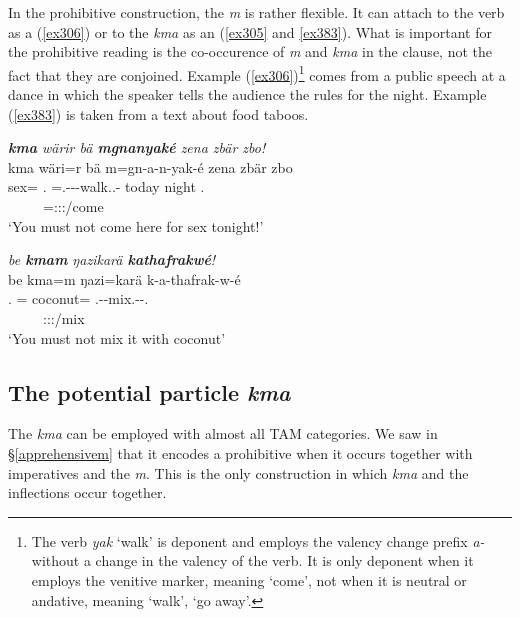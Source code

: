 In the prohibitive construction, the  \emph{m} is rather flexible. It can attach to the verb as a  (\ref{ex306}) or to the   \emph{kma} as an  (\ref{ex305} and \ref{ex383}). What is important for the prohibitive reading is the co-occurence of \emph{m} and \emph{kma} in the clause, not the fact that they are conjoined. Example (\ref{ex306})\footnote{The verb \emph{yak} ‘walk’ is deponent and employs the valency change prefix \emph{a-} without a change in the valency of the verb. It is only deponent when it employs the venitive marker, meaning ‘come’, not when it is neutral or andative, meaning ‘walk’, ‘go away’.} comes from a public speech at a dance in which the speaker tells the audience the rules for the night. Example (\ref{ex383}) is taken from a text about food taboos.

\begin{exe}
	\ex \emph{\textbf{kma} wärir bä \textbf{mgnanyaké} zena zbär zbo!}\\
	\glll kma wäri=r bä m=gn-a-n-yak-é zena zbär zbo\\
	{\Pot} sex={\Purp} \Second.{\Abs} \Appr=\Ssg.\Bet-\Vc-\Venit-walk.\Ext.\Ndu-{\Imp} today night \Prox.\All\\
	~ ~ ~ {\footnotesize \Appr=\Ssg:\Sbj:\Imp:\Ipfv/come} ~ ~ ~\\
	\trans `You must not come here for sex tonight!' 
	\label{ex306}
\end{exe}
\begin{exe}
	\ex \emph{be \textbf{kmam} ŋazikarä \textbf{kathafrakwé}!}\\
	\gll be kma=m ŋazi=karä k-a-thafrak-w-é\\
	\Ssg.{\Erg} \Pot={\Appr} coconut={\Prop} \M.\Bet-\Vc-mix.\Ext-\Ndu-\Ssg.{\Imp}\\
	~ ~ ~ {\footnotesize \Ssg:\Sbj:\Imp:\Ext/mix}\\
	\trans `You must not mix it with coconut' 
	\label{ex383}
\end{exe}

\subsection{The potential particle \emph{kma}}\label{potentialkma}

The   \emph{kma} can be employed with almost all TAM categories. We saw in {\S}\ref{apprehensivem} that it encodes a prohibitive when it occurs together with imperatives and the   \emph{m}. This is the only construction in which \emph{kma} and the  inflections occur together.

